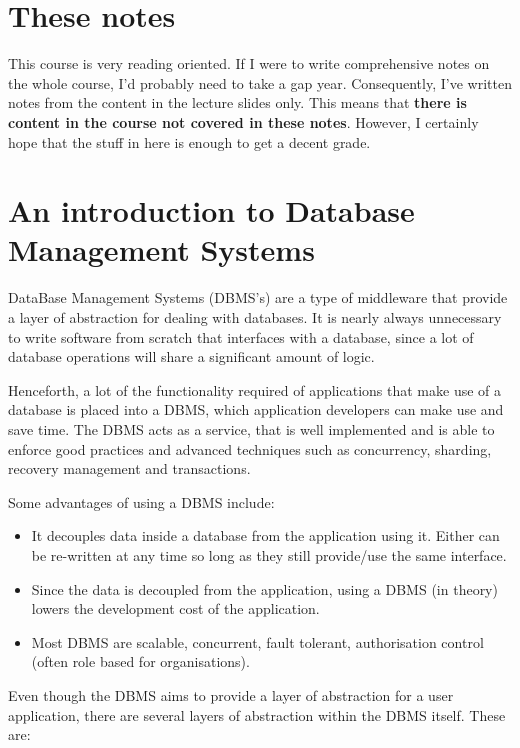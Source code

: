 
\section{These notes}

This course is very reading oriented. If I were to write comprehensive notes on
the whole course, I'd probably need to take a gap year. Consequently, I've
written notes from the content in the lecture slides only. This means that
\textbf{there is content in the course not covered in these notes}. However, I
certainly hope that the stuff in here is enough to get a decent grade.

\section{An introduction to Database Management Systems}

DataBase Management Systems (DBMS's) are a type of middleware that provide a
layer of abstraction for dealing with databases. It is nearly always unnecessary
to write software from scratch that interfaces with a database, since a lot of
database operations will share a significant amount of logic.

Henceforth, a lot of the functionality required of applications that make use of
a database is placed into a DBMS, which application developers can make use and
save time. The DBMS acts as a service, that is well implemented and is able to
enforce good practices and advanced techniques such as concurrency, sharding,
recovery management and transactions.

Some advantages of using a DBMS include:

\begin{itemize}
  \item It decouples data inside a database from the application using it.
        Either can be re-written at any time so long as they still provide/use
        the same interface.
  \item Since the data is decoupled from the application, using a DBMS (in
        theory) lowers the development cost of the application.
  \item Most DBMS are scalable, concurrent, fault tolerant, authorisation
        control (often role based for organisations).
\end{itemize}

Even though the DBMS aims to provide a layer of abstraction for a user
application, there are several layers of abstraction within the DBMS itself.
These are:

